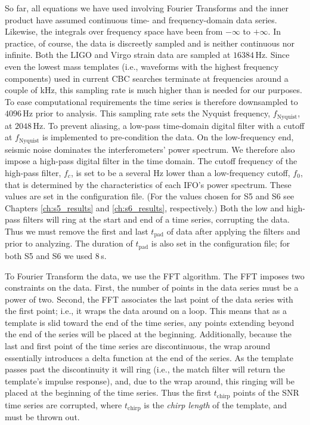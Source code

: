 So far, all equations we have used involving Fourier Transforms and the inner product have assumed continuous time- and frequency-domain data series. Likewise, the integrals over frequency space have been from $-\infty$ to $+\infty$. In practice, of course, the data is discreetly sampled and is neither continuous nor infinite. Both the \ac{LIGO} and Virgo strain data are sampled at $16384\,\mathrm{Hz}$. Since even the lowest mass templates (i.e., waveforms with the highest frequency components) used in current \ac{CBC} searches terminate at frequencies around a couple of kHz, this sampling rate is much higher than is needed for our purposes. To ease computational requirements the time series is therefore downsampled to $4096\,\mathrm{Hz}$ prior to analysis. This sampling rate sets the Nyquist frequency, $f_{\mathrm{Nyquist}}$, at $2048\,\mathrm{Hz}$. To prevent aliasing, a low-pass time-domain digital filter with a cutoff at $f_{\mathrm{Nyquist}}$ is implemented to pre-condition the data. On the low-frequency end, seismic noise dominates the interferometers' power spectrum. We therefore also impose a high-pass digital filter in the time domain. The cutoff frequency of the high-pass filter, $f_c$, is set to be a several Hz lower than a low-frequency cutoff, $f_0$, that is determined by the characteristics of each \ac{IFO}'s power spectrum. These values are set in the configuration file. (For the values chosen for \ac{S5} and \ac{S6} see Chapters \ref{ch:s5_results} and \ref{ch:s6_results}, respectively.) Both the low and high-pass filters will ring at the start and end of a time series, corrupting the data. Thus we must remove the first and last $t_{\mathrm{pad}}$ of data after applying the filters and prior to analyzing. The duration of $t_{\mathrm{pad}}$ is also set in the configuration file; for both \ac{S5} and \ac{S6} we used $8\,$s.

To Fourier Transform the data, we use the \ac{FFT} algorithm. The \ac{FFT} imposes two constraints on the data. First, the number of points in the data series must be a power of two. Second, the \ac{FFT} associates the last point of the data series with the first point; i.e., it wraps the data around on a loop. This means that as a template is slid toward the end of the time series, any points extending beyond the end of the series will be placed at the beginning. Additionally, because the last and first point of the time series are discontinuous, the wrap around essentially introduces a delta function at the end of the series. As the template passes past the discontinuity it will ring (i.e., the match filter will return the template's impulse response), and, due to the wrap around, this ringing will be placed at the beginning of the time series. Thus the first $t_{\mathrm{chirp}}$ points of the \ac{SNR} time series are corrupted, where $t_{\mathrm{chirp}}$ is the \emph{chirp length} of the template, and must be thrown out.

